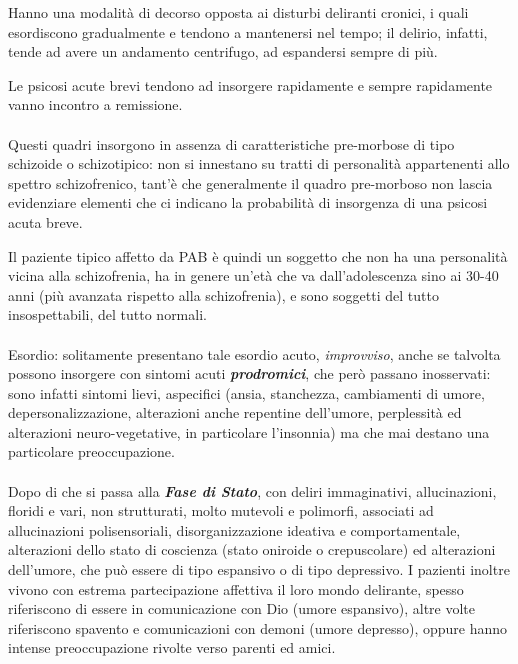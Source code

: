 Hanno una modalità di decorso opposta ai disturbi deliranti cronici, i
quali esordiscono gradualmente e tendono a mantenersi nel tempo; il
delirio, infatti, tende ad avere un andamento centrifugo, ad espandersi
sempre di più.

Le psicosi acute brevi tendono ad insorgere rapidamente e sempre
rapidamente vanno incontro a remissione.
\\\\
Questi quadri insorgono in assenza di caratteristiche pre-morbose di
tipo schizoide o schizotipico: non si innestano su tratti di personalità
appartenenti allo spettro schizofrenico, tant'è che generalmente il
quadro pre-morboso non lascia evidenziare elementi che ci indicano la
probabilità di insorgenza di una psicosi acuta breve.

Il paziente tipico affetto da PAB è quindi un soggetto che non ha una
personalità vicina alla schizofrenia, ha in genere un'età che va
dall'adolescenza sino ai 30-40 anni (più avanzata rispetto alla
schizofrenia), e sono soggetti del tutto insospettabili, del tutto
normali.
\\\\
Esordio: solitamente presentano tale esordio acuto, \emph{improvviso},
anche se talvolta possono insorgere con sintomi acuti
\textbf{\emph{prodromici}}, che però passano inosservati: sono infatti
sintomi lievi, aspecifici (ansia, stanchezza, cambiamenti di umore,
depersonalizzazione, alterazioni anche repentine dell'umore, perplessità
ed alterazioni neuro-vegetative, in particolare l'insonnia) ma che mai
destano una particolare preoccupazione.
\\\\
Dopo di che si passa alla \textbf{\emph{Fase di Stato}}, con deliri
immaginativi, allucinazioni, floridi e vari, non strutturati, molto
mutevoli e polimorfi, associati ad allucinazioni polisensoriali,
disorganizzazione ideativa e comportamentale, alterazioni dello stato di
coscienza (stato oniroide o crepuscolare) ed alterazioni dell'umore, che
può essere di tipo espansivo o di tipo depressivo. I pazienti inoltre
vivono con estrema partecipazione affettiva il loro mondo delirante,
spesso riferiscono di essere in comunicazione con Dio (umore espansivo),
altre volte riferiscono spavento e comunicazioni con demoni (umore
depresso), oppure hanno intense preoccupazione rivolte verso parenti ed
amici.

